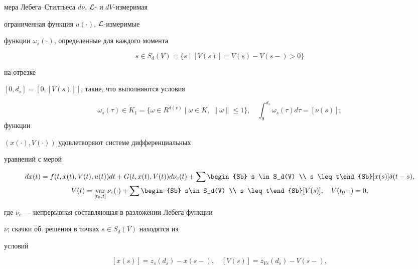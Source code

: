 мера Лебега--Стилтьеса $d\nu$, $\cal{L}$- и $dV$-измеримая


ограниченная функция $u(\cdot)$, $\cal{L}$-измеримые


функции $\omega_s(\cdot)$, определенные для каждого момента


$$


s \in S_d(V)=\{s\mid [V(s)]=V(s)-V(s-)>0\}


$$


на отрезке


$[0,d_s]=[0,[V(s)]]$, такие, что выполняются условия


$$


\omega_s(\tau) \in K_1=\{\omega\in R^{d(v)}\mid \omega \in K, \


\|\omega\| \leq 1\}, \quad


\int_0^{d_s}\omega_s(\tau)d\tau=[\nu (s)];$$ функции


$(x(\cdot),V(\cdot))$ удовлетворяют системе дифференциальных


уравнений с мерой


\begin{gather}


dx(t)=f(t,x(t),V(t),u(t))dt+G(t,x(t),V(t))d\nu_c(t)+


\sum\begin{Sb} s \in S_d(V) \\ s \leq t\end{Sb}


[x(s)]\delta(t-s), \label{gl6} \\


%


V(t)=\var_{[t_0,t]}\nu_c(\cdot)+


\sum\begin{Sb} s\in S_d(V) \\ s \leq t\end{Sb}


[V(s)],\quad V(t_0-)=0, \label{gl7}


\end{gather}


где $\nu_c$ --- непрерывная составляющая в разложении Лебега функции


$\nu$; скачки об. решения в точках $s\in S_d(V)$ находятся из


условий


\begin{equation}


[x(s)]=z_s(d_s)-x(s-), \quad


{[V(s)]} = z_{Vs}(d_s)-V(s-), \label{gl8}


\end{equation}



